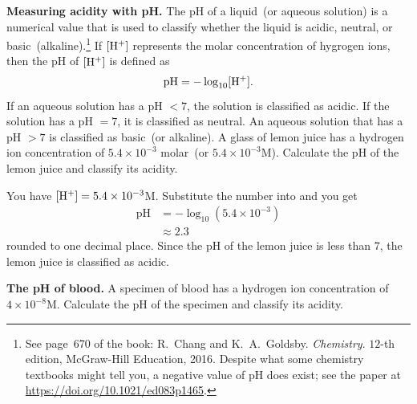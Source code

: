 \documentclass[a4paper,oneside,12pt]{article}
\begin{document}
\begin{example}
\textbf{Measuring acidity with pH.}
The pH of a liquid~(or aqueous solution) is a numerical value that is
used to classify whether the liquid is acidic, neutral, or
basic~(alkaline).\footnote{
  See page~670 of the book:
  R.~Chang and K.~A.~Goldsby. \emph{Chemistry}. $12$-th edition,
  McGraw-Hill Education, 2016.  Despite what some chemistry textbooks
  might tell you, a negative value of pH does exist; see the paper at
  \url{https://doi.org/10.1021/ed083p1465}.
}
If $[{\rm H}^+]$ represents the molar concentration of hygrogen ions, then
the pH of $[{\rm H}^+]$ is defined as
\begin{equation}
\label{eqn:logarithm:pH}
\text{pH}
=
-\log_{10} [{\rm H}^+].
\end{equation}
If an aqueous solution has a pH $< 7$, the solution is classified as
acidic.  If the solution has a pH $ = 7$, it is classified as
neutral.  An aqueous solution that has a pH $> 7$ is classified as
basic~(or alkaline).  A glass of lemon juice has a hydrogen ion
concentration of $5.4 \times 10^{-3}$
molar~(or $5.4 \times 10^{-3}$M).  Calculate the pH of the lemon juice
and classify its acidity.
\end{example}

\begin{solution}
You have $[{\rm H}^+] = 5.4 \times 10^{-3}$M.  Substitute the number into
 and you get
\begin{align*}
\text{pH}
&=
-\log_{10} (5.4 \times 10^{-3}) \\[4pt]
&\approx
2.3
\end{align*}
rounded to one decimal place.  Since the pH of the lemon juice is less
than $7$, the lemon juice is classified as acidic.
\end{solution}

\begin{exercise}
\textbf{The pH of blood.}
A specimen of blood has a hydrogen ion concentration of
$4 \times 10^{-8}$M.  Calculate the pH of the specimen and classify
its acidity.
\end{exercise}

\end{document}
